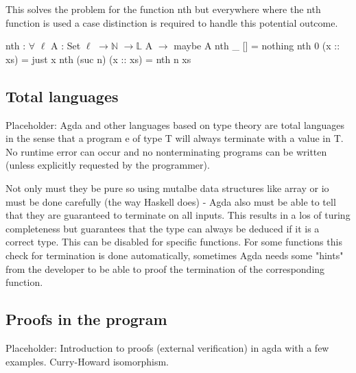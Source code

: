 This solves the problem for the function nth but everywhere where the nth function is used a case distinction is required to handle this potential outcome.
\begin{codesnippet}[mathescape=true, caption={Definition of nth function in Agda}, label={codeSnippet:list_nth}]
nth : $\forall$ {$\ell$} {A : Set $\ell$} $\rightarrow \mathbb{N}$ $\rightarrow \mathbb{L}$ A $\rightarrow$ maybe A
nth _ [] = nothing
nth 0 (x :: xs) = just x
nth (suc n) (x :: xs) = nth n xs
\end{codesnippet}

\subsection{Total languages}\label{section:total_languages}
Placeholder: Agda and other languages based on type theory are total languages in the sense that a program e of type T will always terminate with a value in T. 
No runtime error can occur and no nonterminating programs can be written (unless explicitly requested by the programmer)\cite{AgdaReadTheDocs}.

 Not only must they be pure  so using mutalbe data structures like array or io must be done carefully (the way Haskell does) - Agda also must be able to tell that they are guaranteed to terminate on all inputs. 
This results in a los of turing completeness but guarantees that the type can always be deduced if it is a correct type. 
This can be disabled for specific functions. For some functions this check for termination is done automatically, sometimes Agda needs some "hints" from the developer to be able to proof the termination of the corresponding function.
\subsection{Proofs in the program}
Placeholder: Introduction to proofs (external verification) in agda with a few examples.
Curry-Howard isomorphism.
\cite{norell:deptyped, 10.1145/2841316, plfa2019}

